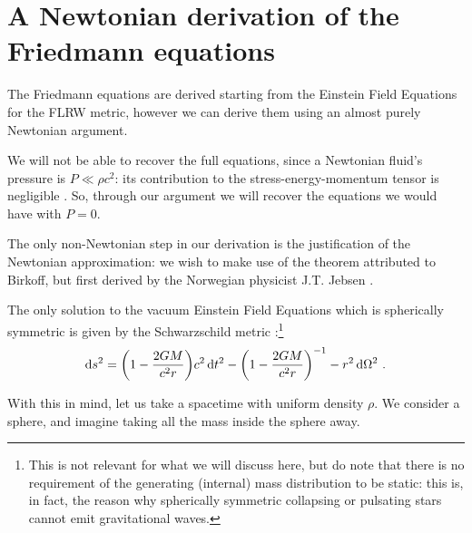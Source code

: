 \documentclass[main.tex]{subfiles}
\begin{document}
\section{A Newtonian derivation of the Friedmann equations}

The Friedmann equations are derived starting from the Einstein Field Equations for the FLRW metric, however we can derive them using an almost purely Newtonian argument.

We will not be able to recover the full equations, since a Newtonian fluid's pressure is \(P \ll \rho c^2\): its contribution to the stress-energy-momentum tensor is negligible \cite[eqs. 441--443]{tissinoGeneralRelativityNotes2020}.
So, through our argument we will recover the equations we would have with \(P=0\).

The only non-Newtonian step in our derivation is the justification of the Newtonian approximation: we wish to make use of the theorem attributed to Birkoff, but first derived by the Norwegian physicist J.T. Jebsen \cite[]{johansenDiscoveryBirkhoffTheorem2005}.

\begin{proposition}
The only solution to the vacuum Einstein Field Equations which is spherically symmetric is given by the Schwarzschild metric \cite[sec. 32.2]{misnerGravitation1973}:\footnote{This is not relevant for what we will discuss here, but do note that there is no requirement of the generating (internal) mass distribution to be static: this is, in fact, the reason why spherically symmetric collapsing or pulsating stars cannot emit  gravitational waves.}
%
\begin{align}
\dd{s^2} =  \qty(1 - \frac{2GM}{c^2r}) c^2 \dd{t^2} 
- \qty(1 - \frac{2GM}{c^2r})^{-1} - r^2 \dd{\Omega^2}
\,.
\end{align}
\end{proposition}

With this in mind, let us take a spacetime with uniform density \(\rho\).
We consider a sphere, and imagine taking all the mass inside the sphere away.

\end{document}
